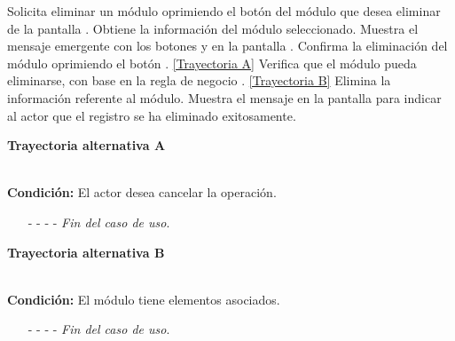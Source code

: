	\begin{UCtrayectoria}
		\UCpaso[\UCactor] Solicita eliminar un módulo oprimiendo el botón \eliminar del módulo que desea eliminar de la pantalla .
		\UCpaso[\UCsist] Obtiene la información del módulo seleccionado.
		\UCpaso[\UCsist] Muestra el mensaje emergente  con los botones  y  en la pantalla .
		\UCpaso[\UCactor] Confirma la eliminación del módulo oprimiendo el botón . \hyperlink{CU5-3:TAA}{[Trayectoria A]}
		\UCpaso[\UCsist] Verifica que el módulo pueda eliminarse, con base en la regla de negocio . \hyperlink{CU5-3:TAB}{[Trayectoria B]}
		\UCpaso[\UCsist] Elimina la información referente al módulo.
		\UCpaso[\UCsist] Muestra el mensaje  en la pantalla  para indicar al actor que el registro se ha eliminado exitosamente.
	\end{UCtrayectoria}		
\hypertarget{CU5-3:TAA}{\textbf{Trayectoria alternativa A}}\\
\noindent \textbf{Condición:} El actor desea cancelar la operación.
\begin{enumerate}
	\UCpaso[\UCactor] Solicita cancelar la operación oprimiendo el botón  del mensaje emergente .
	\UCpaso[\UCsist] Muestra la pantalla .
	\item[- -] - - {\em {Fin del caso de uso}}.%
\end{enumerate}

\hypertarget{CU5-3:TAB}{\textbf{Trayectoria alternativa B}}\\
\noindent \textbf{Condición:} El módulo tiene elementos asociados.
\begin{enumerate}
	\UCpaso[\UCsist] Muestra el mensaje  en la pantalla .
	\item[- -] - - {\em {Fin del caso de uso}}.%
\end{enumerate}
	

